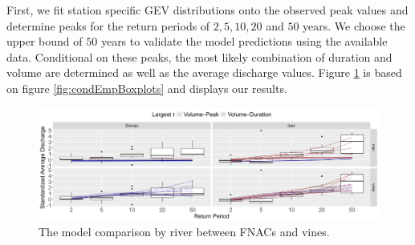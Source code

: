 \documentclass[
]{krantz}
\begin{document}
First, we fit
station specific GEV distributions onto the observed peak values and determine peaks
for the return periods of \(2, 5, 10, 20\) and \(50\) years.
We choose the upper bound of \(50\) years to validate the model predictions using the available data.
Conditional on these peaks, the most likely combination of duration and volume are determined as well as
the average discharge values.
Figure \ref{fig:modelEval} is based on figure \ref{fig:condEmpBoxplots} and displays our results.

\begin{figure}

{\centering \includegraphics[width=0.7\linewidth]{work/04-floodfreq/figures/app_modeleval} 

}

\caption{The model comparison by river between FNACs and vines.}\label{fig:modelEval}
\end{figure}
\end{document}
